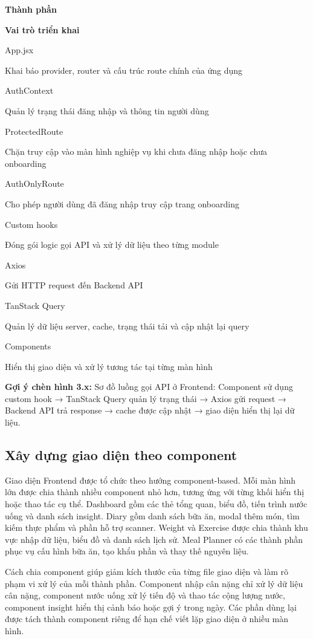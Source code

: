\documentclass[12pt, a4paper]{report}
\begin{document}
\textbf{Thành phần}

\textbf{Vai trò triển khai}

App.jsx

Khai báo provider, router và cấu trúc route chính của ứng dụng

AuthContext

Quản lý trạng thái đăng nhập và thông tin người dùng

ProtectedRoute

Chặn truy cập vào màn hình nghiệp vụ khi chưa đăng nhập hoặc chưa onboarding

AuthOnlyRoute

Cho phép người dùng đã đăng nhập truy cập trang onboarding

Custom hooks

Đóng gói logic gọi API và xử lý dữ liệu theo từng module

Axios

Gửi HTTP request đến Backend API

TanStack Query

Quản lý dữ liệu server, cache, trạng thái tải và cập nhật lại query

Components

Hiển thị giao diện và xử lý tương tác tại từng màn hình

\textbf{Gợi ý chèn hình 3.x:} Sơ đồ luồng gọi API ở Frontend: Component sử dụng custom hook → TanStack Query quản lý trạng thái → Axios gửi request → Backend API trả response → cache được cập nhật → giao diện hiển thị lại dữ liệu.

\subsection{Xây dựng giao diện theo component}Giao diện Frontend được tổ chức theo hướng component-based. Mỗi màn hình lớn được chia thành nhiều component nhỏ hơn, tương ứng với từng khối hiển thị hoặc thao tác cụ thể. Dashboard gồm các thẻ tổng quan, biểu đồ, tiến trình nước uống và danh sách insight. Diary gồm danh sách bữa ăn, modal thêm món, tìm kiếm thực phẩm và phần hỗ trợ scanner. Weight và Exercise được chia thành khu vực nhập dữ liệu, biểu đồ và danh sách lịch sử. Meal Planner có các thành phần phục vụ cấu hình bữa ăn, tạo khẩu phần và thay thế nguyên liệu.

Cách chia component giúp giảm kích thước của từng file giao diện và làm rõ phạm vi xử lý của mỗi thành phần. Component nhập cân nặng chỉ xử lý dữ liệu cân nặng, component nước uống xử lý tiến độ và thao tác cộng lượng nước, component insight hiển thị cảnh báo hoặc gợi ý trong ngày. Các phần dùng lại được tách thành component riêng để hạn chế viết lặp giao diện ở nhiều màn hình.
\end{document}
